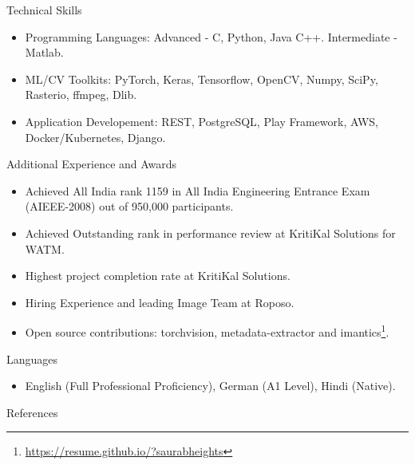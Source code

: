 \documentclass[]{mcdowellcv}
\begin{document}
    \begin{cvsection}{Technical Skills}
        \begin{cvsubsection}{}{}{}    
            \begin{itemize}
                \item Programming Languages: Advanced - C, Python, Java C++. Intermediate - Matlab.
                \item ML/CV Toolkits: PyTorch, Keras, Tensorflow, OpenCV, Numpy, SciPy, Rasterio, ffmpeg, Dlib.
                \item Application Developement: REST, PostgreSQL, Play Framework, AWS, Docker/Kubernetes, Django.
            \end{itemize}
        \end{cvsubsection}
    \end{cvsection}
    
    \begin{cvsection}{Additional Experience and Awards}
        \begin{cvsubsection}{}{}{}    
            \begin{itemize}
                \item Achieved All India rank 1159 in All India Engineering Entrance Exam (AIEEE-2008) out of 950,000 participants.
                \item Achieved Outstanding rank in performance review at KritiKal Solutions for WATM.
                \item Highest project completion rate at KritiKal Solutions.
                \item Hiring Experience and leading Image Team at Roposo.
                \item Open source contributions: torchvision, metadata-extractor and imantics\footnote{\href{https://resume.github.io/?saurabheights}{https://resume.github.io/?saurabheights}}.
            \end{itemize}
        \end{cvsubsection}
    \end{cvsection}
    
    \begin{cvsection}{Languages}
        \begin{cvsubsection}{}{}{}    
            \begin{itemize}
                \item English (Full Professional Proficiency), German (A1 Level), Hindi (Native).
            \end{itemize}
        \end{cvsubsection}
    \end{cvsection}
    
        \begin{cvsection}{References}

         \printbibliography[heading=none]

    \end{cvsection}
    
\end{document}
